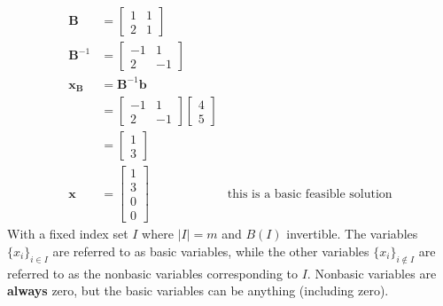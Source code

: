 \documentclass[a4paper, 12pt]{article}
\newcommand{\mat}[1]{\boldsymbol{#1}}
\renewcommand{\vec}[1]{\boldsymbol{#1}}
\begin{document}
                \begin{align*}
                    \mat{B} & = \begin{bmatrix}
                        1 & 1 \\
                        2 & 1
                    \end{bmatrix} \\
                    \mat{B}^{-1} & = \begin{bmatrix}
                        -1 & 1 \\
                        2 & -1
                    \end{bmatrix} \\
                    \vec{x_B} & = \mat{B}^{-1}\vec{b} \\
                    & = \begin{bmatrix}
                        -1 & 1 \\
                        2 & -1
                    \end{bmatrix} \begin{bmatrix}
                        4 \\ 5
                    \end{bmatrix} \\
                    & = \begin{bmatrix}
                        1 \\ 3
                    \end{bmatrix} \\
                    \vec{x} & = \begin{bmatrix}
                        1 \\ 3 \\ 0 \\ 0
                    \end{bmatrix} & \text{this is a basic feasible solution}
                \end{align*}
                With a fixed index set $I$ where $|I| = m$ and $B(I)$ invertible.
                The variables $\{x_i\}_{i \in I}$ are referred to as basic variables, while the other variables $\{x_i\}_{i \notin I}$ are referred to as the nonbasic variables corresponding to $I$.
                Nonbasic variables are \textbf{always} zero, but the basic variables can be anything (including zero).
                \medskip
\end{document}
